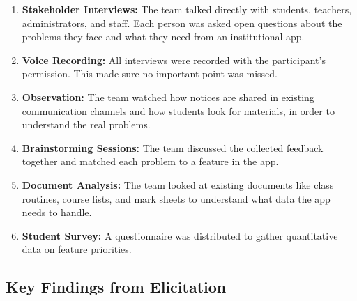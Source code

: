\documentclass[12pt,a4paper]{article}
\begin{document}
\begin{enumerate}[leftmargin=*, label=\textbf{\arabic*.}, itemsep=5pt]
  \item \textbf{Stakeholder Interviews:} The team talked directly with students, teachers, administrators, and staff. Each person was asked open questions about the problems they face and what they need from an institutional app.
  \item \textbf{Voice Recording:} All interviews were recorded with the participant's permission. This made sure no important point was missed.
  \item \textbf{Observation:} The team watched how notices are shared in existing communication channels and how students look for materials, in order to understand the real problems.
  \item \textbf{Brainstorming Sessions:} The team discussed the collected feedback together and matched each problem to a feature in the app.
  \item \textbf{Document Analysis:} The team looked at existing documents like class routines, course lists, and mark sheets to understand what data the app needs to handle.
  \item \textbf{Student Survey:} A questionnaire was distributed to gather quantitative data on feature priorities.
\end{enumerate}
\newpage
\subsection{Key Findings from Elicitation}
\end{document}
